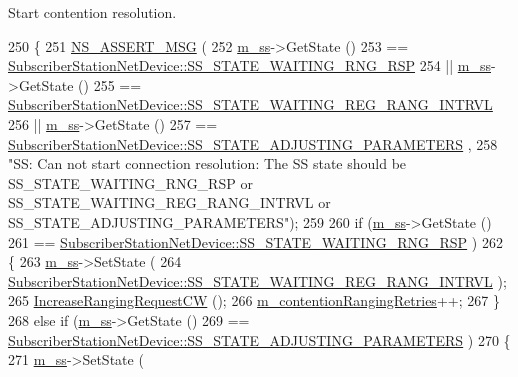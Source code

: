Start contention resolution. 


\begin{DoxyCode}
250 \{
251   \hyperlink{assert_8h_aff5ece9066c74e681e74999856f08539}{NS\_ASSERT\_MSG} (
252     \hyperlink{classns3_1_1SSLinkManager_a44506c63befdc33eb0e0b4ba7f93d498}{m\_ss}->GetState ()
253     == \hyperlink{classns3_1_1SubscriberStationNetDevice_af9f145bc05df1f18610a3d4b61ff9ee4acb68c803df0eb6a0f4cc41389f981db8}{SubscriberStationNetDevice::SS\_STATE\_WAITING\_RNG\_RSP}
254     || \hyperlink{classns3_1_1SSLinkManager_a44506c63befdc33eb0e0b4ba7f93d498}{m\_ss}->GetState ()
255     == \hyperlink{classns3_1_1SubscriberStationNetDevice_af9f145bc05df1f18610a3d4b61ff9ee4a49bac6877dbda9589f7576e42cf5c15f}{SubscriberStationNetDevice::SS\_STATE\_WAITING\_REG\_RANG\_INTRVL}
256     || \hyperlink{classns3_1_1SSLinkManager_a44506c63befdc33eb0e0b4ba7f93d498}{m\_ss}->GetState ()
257     == \hyperlink{classns3_1_1SubscriberStationNetDevice_af9f145bc05df1f18610a3d4b61ff9ee4ab966447e17e355aff9bf29f0a92bd4a5}{SubscriberStationNetDevice::SS\_STATE\_ADJUSTING\_PARAMETERS}
      ,
258     \textcolor{stringliteral}{"SS: Can not start connection resolution: The SS state should be SS\_STATE\_WAITING\_RNG\_RSP or
       SS\_STATE\_WAITING\_REG\_RANG\_INTRVL or SS\_STATE\_ADJUSTING\_PARAMETERS"});
259 
260   \textcolor{keywordflow}{if} (\hyperlink{classns3_1_1SSLinkManager_a44506c63befdc33eb0e0b4ba7f93d498}{m\_ss}->GetState ()
261       == \hyperlink{classns3_1_1SubscriberStationNetDevice_af9f145bc05df1f18610a3d4b61ff9ee4acb68c803df0eb6a0f4cc41389f981db8}{SubscriberStationNetDevice::SS\_STATE\_WAITING\_RNG\_RSP}
      )
262     \{
263       \hyperlink{classns3_1_1SSLinkManager_a44506c63befdc33eb0e0b4ba7f93d498}{m\_ss}->SetState (
264         \hyperlink{classns3_1_1SubscriberStationNetDevice_af9f145bc05df1f18610a3d4b61ff9ee4a49bac6877dbda9589f7576e42cf5c15f}{SubscriberStationNetDevice::SS\_STATE\_WAITING\_REG\_RANG\_INTRVL}
      );
265       \hyperlink{classns3_1_1SSLinkManager_a65b4c7fff8954b4b7c8c41e3f9bdce3f}{IncreaseRangingRequestCW} ();
266       \hyperlink{classns3_1_1SSLinkManager_a4cc5616652cf22b6d194bcbc85966bcb}{m\_contentionRangingRetries}++;
267     \}
268   \textcolor{keywordflow}{else} \textcolor{keywordflow}{if} (\hyperlink{classns3_1_1SSLinkManager_a44506c63befdc33eb0e0b4ba7f93d498}{m\_ss}->GetState ()
269            == \hyperlink{classns3_1_1SubscriberStationNetDevice_af9f145bc05df1f18610a3d4b61ff9ee4ab966447e17e355aff9bf29f0a92bd4a5}{SubscriberStationNetDevice::SS\_STATE\_ADJUSTING\_PARAMETERS}
      )
270     \{
271       \hyperlink{classns3_1_1SSLinkManager_a44506c63befdc33eb0e0b4ba7f93d498}{m\_ss}->SetState (

\end{DoxyCode}
